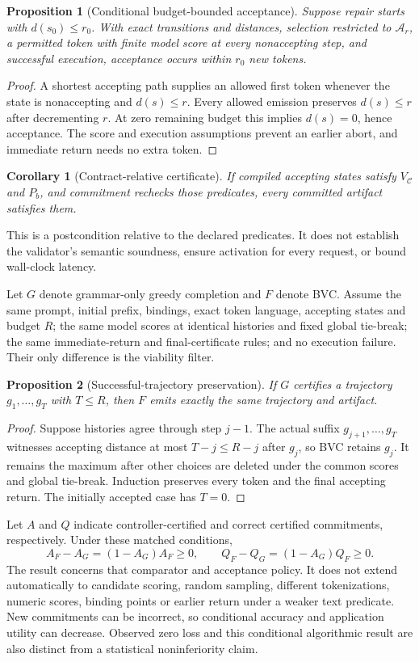 \documentclass[12pt,a4paper]{article}
\newtheorem{proposition}{Proposition}
\newtheorem{corollary}{Corollary}
\begin{document}
\begin{proposition}[Conditional budget-bounded acceptance]\label{prop:completion}
Suppose repair starts with $d(s_0)\le r_0$. With exact transitions and distances, selection restricted to $\mathcal A_r$, a permitted token with finite model score at every nonaccepting step, and successful execution, acceptance occurs within $r_0$ new tokens.
\end{proposition}
\begin{proof}
A shortest accepting path supplies an allowed first token whenever the state is nonaccepting and $d(s)\le r$. Every allowed emission preserves $d(s)\le r$ after decrementing $r$. At zero remaining budget this implies $d(s)=0$, hence acceptance. The score and execution assumptions prevent an earlier abort, and immediate return needs no extra token.
\end{proof}
\begin{corollary}[Contract-relative certificate]\label{cor:certificate}
If compiled accepting states satisfy $V_{\mathcal C}$ and $P_b$, and commitment rechecks those predicates, every committed artifact satisfies them.
\end{corollary}
This is a postcondition relative to the declared predicates. It does not establish the validator's semantic soundness, ensure activation for every request, or bound wall-clock latency.

Let $G$ denote grammar-only greedy completion and $F$ denote BVC. Assume the same prompt, initial prefix, bindings, exact token language, accepting states and budget $R$; the same model scores at identical histories and fixed global tie-break; the same immediate-return and final-certificate rules; and no execution failure. Their only difference is the viability filter.
\begin{proposition}[Successful-trajectory preservation]\label{prop:preservation}
If $G$ certifies a trajectory $g_1,\ldots,g_T$ with $T\le R$, then $F$ emits exactly the same trajectory and artifact.
\end{proposition}
\begin{proof}
Suppose histories agree through step $j-1$. The actual suffix $g_{j+1},\ldots,g_T$ witnesses accepting distance at most $T-j\le R-j$ after $g_j$, so BVC retains $g_j$. It remains the maximum after other choices are deleted under the common scores and global tie-break. Induction preserves every token and the final accepting return. The initially accepted case has $T=0$.
\end{proof}
Let $A$ and $Q$ indicate controller-certified and correct certified commitments, respectively. Under these matched conditions,
\begin{equation}
 A_F-A_G=(1-A_G)A_F\ge0,\qquad Q_F-Q_G=(1-A_G)Q_F\ge0.\label{eq:preserve}
\end{equation}
The result concerns that comparator and acceptance policy. It does not extend automatically to candidate scoring, random sampling, different tokenizations, numeric scores, binding points or earlier return under a weaker text predicate. New commitments can be incorrect, so conditional accuracy and application utility can decrease. Observed zero loss and this conditional algorithmic result are also distinct from a statistical noninferiority claim.
\end{document}
